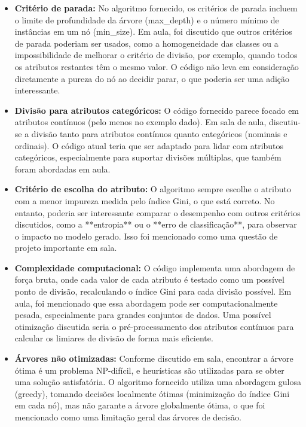 \documentclass[12pt]{article}
\begin{document}
\begin{itemize}
    \item \textbf{Critério de parada:} No algoritmo fornecido, os critérios de parada incluem o limite de profundidade da árvore (max\_depth) e o número mínimo de instâncias em um nó (min\_size). Em aula, foi discutido que outros critérios de parada poderiam ser usados, como a homogeneidade das classes ou a impossibilidade de melhorar o critério de divisão, por exemplo, quando todos os atributos restantes têm o mesmo valor. O código não leva em consideração diretamente a pureza do nó ao decidir parar, o que poderia ser uma adição interessante.
    
    \item \textbf{Divisão para atributos categóricos:} O código fornecido parece focado em atributos contínuos (pelo menos no exemplo dado). Em sala de aula, discutiu-se a divisão tanto para atributos contínuos quanto categóricos (nominais e ordinais). O código atual teria que ser adaptado para lidar com atributos categóricos, especialmente para suportar divisões múltiplas, que também foram abordadas em aula.
    
    \item \textbf{Critério de escolha do atributo:} O algoritmo sempre escolhe o atributo com a menor impureza medida pelo índice Gini, o que está correto. No entanto, poderia ser interessante comparar o desempenho com outros critérios discutidos, como a **entropia** ou o **erro de classificação**, para observar o impacto no modelo gerado. Isso foi mencionado como uma questão de projeto importante em sala.
    
    \item \textbf{Complexidade computacional:} O código implementa uma abordagem de força bruta, onde cada valor de cada atributo é testado como um possível ponto de divisão, recalculando o índice Gini para cada divisão possível. Em aula, foi mencionado que essa abordagem pode ser computacionalmente pesada, especialmente para grandes conjuntos de dados. Uma possível otimização discutida seria o pré-processamento dos atributos contínuos para calcular os limiares de divisão de forma mais eficiente.
    
    \item \textbf{Árvores não otimizadas:} Conforme discutido em sala, encontrar a árvore ótima é um problema NP-difícil, e heurísticas são utilizadas para se obter uma solução satisfatória. O algoritmo fornecido utiliza uma abordagem gulosa (greedy), tomando decisões localmente ótimas (minimização do índice Gini em cada nó), mas não garante a árvore globalmente ótima, o que foi mencionado como uma limitação geral das árvores de decisão.
\end{itemize}
\end{document}
